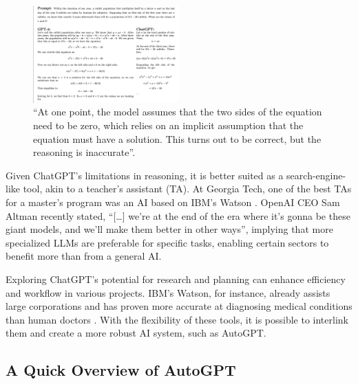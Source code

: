 \documentclass[letterpaper, 10pt, conference]{ieeeconf}
\begin{document}
   \begin{figure}
       \centering
       \includegraphics[width=0.50\textwidth]{images/math_explanation.png}
       \caption{\enquote{At one point, the model assumes that the two sides of the equation need to be zero, which relies on an implicit assumption
       that the equation must have a solution. This turns out to be correct, but the reasoning is inaccurate}\cite{bubeck2023sparks}.}       
       \label{fig:image1}
   \end{figure}
   
   Given ChatGPT's limitations in reasoning, it is better suited as a search-engine-like tool, akin to a teacher's assistant (TA). At Georgia Tech, one of the best TAs for a master's program was an AI based on IBM's Watson \cite{popenici2017}. OpenAI CEO Sam Altman recently stated, 
   \enquote{[…] we're at the end of the era where it's gonna be these giant models, and we'll make them better in other ways}\cite{miller2023}, implying that more specialized LLMs are preferable for specific tasks, enabling certain sectors to benefit more than from a general AI.
   
   Exploring ChatGPT's potential for research and planning can enhance efficiency and workflow in various projects. IBM's Watson, for instance, already assists large corporations and has proven more accurate at diagnosing medical conditions than human doctors \cite{popenici2017}. With the flexibility of these tools, it is possible to interlink them and create a more robust AI system, such as AutoGPT.

   \subsection{A Quick Overview of AutoGPT}


    
    
\end{document}
